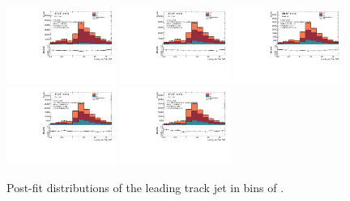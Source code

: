 \begin{figure}[htbp]
  \centering
 \includegraphics[width=0.32\textwidth]{figures/gbb/Sub_Sd0_Fits/Canv_Fit_0-Zp_T-01_LpT_INF_SpT_INF_coarse_x.pdf}
 \includegraphics[width=0.32\textwidth]{figures/gbb/Sub_Sd0_Fits/Canv_Fit_01-Zp_T-02_LpT_INF_SpT_INF_coarse_x.pdf}
 \includegraphics[width=0.32\textwidth]{figures/gbb/Sub_Sd0_Fits/Canv_Fit_02-Zp_T-03_LpT_INF_SpT_INF_coarse_x.pdf}\\
 \includegraphics[width=0.32\textwidth]{figures/gbb/Sub_Sd0_Fits/Canv_Fit_03-Zp_T-04_LpT_INF_SpT_INF_coarse_x.pdf}
 \includegraphics[width=0.32\textwidth]{figures/gbb/Sub_Sd0_Fits/Canv_Fit_04-Zp_T-05_LpT_INF_SpT_INF_coarse_x.pdf}


\caption{Post-fit \subsdzero distributions of the leading track jet in bins of \zpt. }
  \label{fig:ZpT-postfits-leading}
\end{figure}


